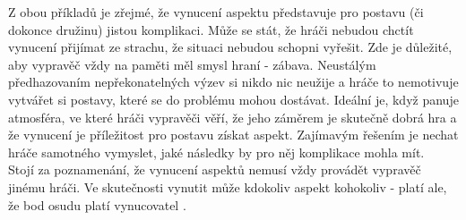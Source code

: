 \documentclass[../main.tex]{subfiles}
\begin{document}
Z obou příkladů je zřejmé, že vynucení aspektu představuje pro postavu (či dokonce družinu) jistou komplikaci. Může se stát, že hráči nebudou chctít vynucení přijímat ze strachu, že situaci nebudou schopni vyřešit. Zde je důležité, aby vypravěč vždy na paměti měl smysl hraní - zábava. Neustálým předhazovaním nepřekonatelných výzev si nikdo nic neužije a hráče to nemotivuje vytvářet si postavy, které se do problému mohou dostávat. Ideální je, když panuje atmosféra, ve které hráči vypravěči věří, že jeho záměrem je skutečně dobrá hra a že vynucení je příležitost pro postavu získat aspekt. Zajímavým řešením je nechat hráče samotného vymyslet, jaké následky by pro něj komplikace mohla mít.\\


Stojí za poznamenání, že vynucení aspektů nemusí vždy provádět vypravěč jinému hráči. Ve skutečnosti vynutit může kdokoliv aspekt kohokoliv - platí ale, že bod osudu platí vynucovatel . 
\end{document}

